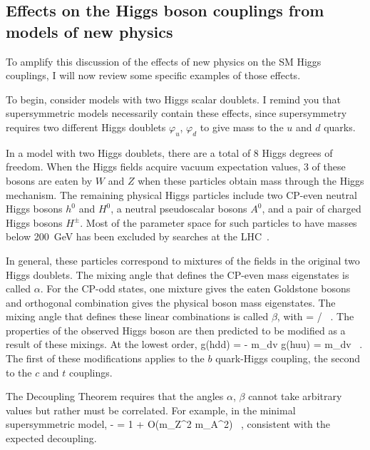 \documentclass[12pt]{article}
\begin{document}
\subsection{Effects on the Higgs boson couplings 
from models of new physics}

To amplify this discussion of the effects of new physics on  the SM
Higgs couplings,  I will now review some specific
examples of those effects.


To begin, consider models with two Higgs scalar doublets.   I remind
you that supersymmetric models necessarily contain these effects,
since supersymmetry requires two  different Higgs doublets 
$\varphi_u$, $\varphi_d$ to give mass
to the $u$ and $d$ quarks.

In a model with two Higgs doublets, there are a total of 8 Higgs
degrees of freedom.    When the Higgs fields acquire vacuum
expectation values, 3 of these bosons are eaten by $W$ and $Z$ when
these particles obtain mass through the Higgs mechanism.  The
remaining physical Higgs particles include two CP-even neutral Higgs
bosons $h^0$ and $H^0$, a neutral pseudoscalar bosons $A^0$, and a
pair of charged Higgs bosons $H^\pm$.   Most of the parameter space
for such particles to have masses below 200~GeV has been excluded by
searches at the LHC~\cite{LHCHiggssearchesC,LHCHiggssearchesA}.  

  In general, these
particles correspond to  mixtures of the fields  in the original two
Higgs doublets.    The mixing angle that
defines the CP-even mass eigenstates is called $\alpha$.    For the 
CP-odd states, one mixture gives the eaten Goldstone bosons and
orthogonal combination gives
 the physical boson mass eigenstates.   The mixing angle that
defines these linear combinations is called $\beta$, with 
\beq
     \tan \beta =    / \ . 
\eeqn
The properties of the observed Higgs boson are then predicted to be
modified as a result of these mixings.  At the lowest order,
\beq
      g(hdd) = - {\sin \alpha\over \cos\beta} {m_d\over v} \qquad
       g(huu) =  {\cos \alpha\over \sin\beta} {m_d\over v}  \ .
\eeqn
The first of these modifications applies to the $b$ quark-Higgs coupling,
the second to the $c$ and $t$ couplings.

The Decoupling Theorem requires that the angles $\alpha$, $\beta$
cannot take arbitrary values but rather must be correlated.   For
example, in the minimal supersymmetric model,
\beq
   - {\sin \alpha\over \cos\beta}  = 1 + {\cal O}({m_Z^2\over
          m_A^2}) \ ,
\eeqn
consistent with the expected decoupling.
\end{document}
